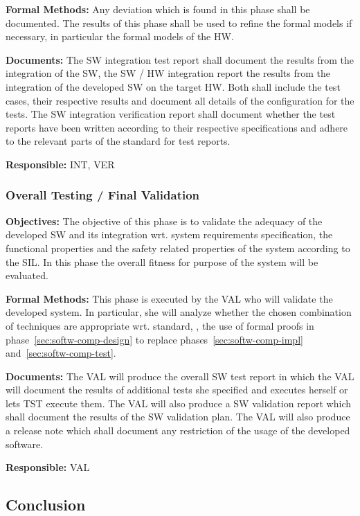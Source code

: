 {\bf Formal Methods:} Any deviation which is found in this phase shall be
documented. The results of this phase shall be used to refine the formal models
if necessary, in particular the formal models of the HW.

{\bf Documents:} The SW integration test report shall document the results from
the integration of the SW, the SW / HW integration report the results from the
integration of the developed SW on the target HW. Both shall include the test
cases, their respective results and document all details of the configuration
for the tests. The SW integration verification report shall document whether the
test reports have been written according to their respective specifications and
adhere to the relevant parts of the standard for test reports.

{\bf Responsible:} INT, VER

\subsubsection{Overall Testing / Final Validation}
\label{sec:overall-testing-}

{\bf Objectives:} The objective of this phase is to validate the adequacy of the
developed SW and its integration wrt. system requirements specification, the
functional properties and the safety related properties of the system according
to the SIL. In this phase the overall fitness for purpose of the system will be
evaluated.

{\bf Formal Methods:} This phase is executed by the VAL who will validate the
developed system. In particular, she will analyze whether the chosen combination
of techniques are appropriate wrt. standard, \eg, the use of formal proofs in
phase~\ref{sec:softw-comp-design} to replace phases~\ref{sec:softw-comp-impl}
and~\ref{sec:softw-comp-test}.

{\bf Documents:} The VAL will produce the overall SW test report in which the
VAL will document the results of additional tests she specified and executes
herself or lets TST execute them. The VAL will also produce a SW validation
report which shall document the results of the SW validation plan. The VAL will
also produce a release note which shall document any restriction of the usage of
the developed software.

{\bf Responsible:} VAL


\subsection{Conclusion}
\label{sec:conclusion-fm-process}

